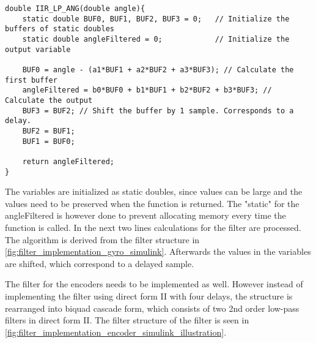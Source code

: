 \begin{lstlisting}
double IIR_LP_ANG(double angle){
	static double BUF0, BUF1, BUF2, BUF3 = 0;	// Initialize the buffers of static doubles
	static double angleFiltered = 0;			// Initialize the output variable
	
	BUF0 = angle - (a1*BUF1 + a2*BUF2 + a3*BUF3); // Calculate the first buffer
	angleFiltered = b0*BUF0 + b1*BUF1 + b2*BUF2 + b3*BUF3; // Calculate the output
	BUF3 = BUF2; // Shift the buffer by 1 sample. Corresponds to a delay.
	BUF2 = BUF1;
	BUF1 = BUF0;
	
	return angleFiltered;
}
\end{lstlisting}
The variables are initialized as static doubles, since values can be large and the values need to be preserved when the function is returned. The "static" for the angleFiltered is however done to prevent allocating memory every time the function is called. In the next two lines calculations for the filter are processed. The algorithm is derived from the filter structure in \autoref{fig:filter_implementation_gyro_simulink}. Afterwards the values in the variables are shifted, which correspond to a delayed sample.

The filter for the encoders needs to be implemented as well. However instead of implementing the filter using direct form II with four delays, the structure is rearranged into biquad cascade form, which consists of two 2nd order low-pass filters in direct form II. The filter structure of the filter is seen in \autoref{fig:filter_implementation_encoder_simulink_illustration}.

